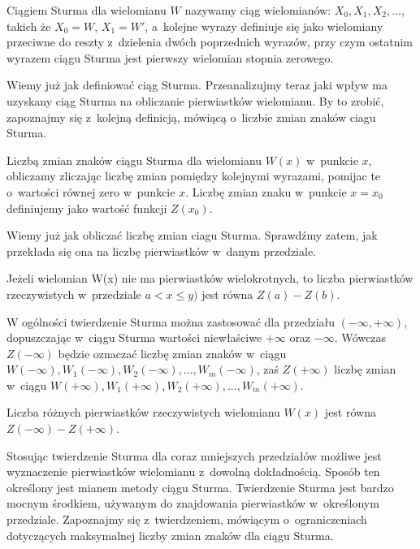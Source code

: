 \begin{definition}
	$ $ \\
	Ciągiem Sturma dla wielomianu $W$ nazywamy ciąg wielomianów: $X_0, X_1, X_2,...$, takich że $X_0=W$, $X_1=W'$, a~kolejne wyrazy definiuje się jako wielomiany przeciwne do reszty z~dzielenia dwóch poprzednich wyrazów, przy czym ostatnim wyrazem ciągu Sturma jest pierwszy wielomian stopnia zerowego. 
\end{definition}

Wiemy już jak definiować ciąg Sturma. Przeanalizujmy teraz jaki wpływ ma uzyskany ciąg Sturma na obliczanie pierwiastków wielomianu. By to zrobić, zapoznajmy się z~kolejną definicją, mówiącą o~liczbie zmian znaków ciagu Sturma.

\begin{definition}
	$ $ \\
	Liczbą zmian znaków ciągu Sturma dla wielomianu $W(x)$ w~punkcie $x$, obliczamy zliczając liczbę zmian pomiędzy kolejnymi wyrazami, pomijac te o~wartości równej zero w~punkcie $x$. Liczbę zmian znaku w~punkcie $x=x_0$ definiujemy jako wartość funkcji $Z(x_0)$.
\end{definition}

Wiemy już jak obliczać liczbę zmian ciagu Sturma. Sprawdźmy zatem, jak przekłada się ona na liczbę pierwiastków w~danym przedziale.

\begin{theorem}
	$ $ \\
	Jeżeli wielomian W(x) nie ma pierwiastków wielokrotnych, to liczba pierwiastków rzeczywistych w~przedziale $a<x\le y)$ jest równa $Z(a) - Z(b)$.
\end{theorem}

W ogólności twierdzenie Sturma można zastosować dla przedziału $(-\infty,+\infty)$, dopuszczając w~ciągu Sturma wartości niewłaściwe $+\infty$ oraz $-\infty$. Wówczas $Z(-\infty)$ będzie oznaczać liczbę zmian znaków w~ciągu $W(-\infty), W_1(-\infty), W_2(-\infty),..., W_m(-\infty)$, zaś $Z(+\infty)$ liczbę zmian w~ciągu $W(+\infty), W_1(+\infty), W_2(+\infty),..., W_m(+\infty)$.

\begin{theorem}
	$ $ \\
	Liczba różnych pierwiastków rzeczywistych wielomianu $W(x)$ jest równa $Z(-\infty)-Z(+\infty)$.
\end{theorem}

Stosując twierdzenie Sturma dla coraz mniejszych przedziałów możliwe jest wyznaczenie pierwiastków wielomianu z~dowolną dokładnością. Sposób ten określony jest mianem metody ciągu Sturma.
Twierdzenie Sturma jest bardzo mocnym środkiem, używanym do znajdowania pierwiastków w~określonym przedziale. Zapoznajmy się z~twierdzeniem, mówiącym o~ograniczeniach dotyczących maksymalnej liczby zmian znaków dla ciągu Sturma.

